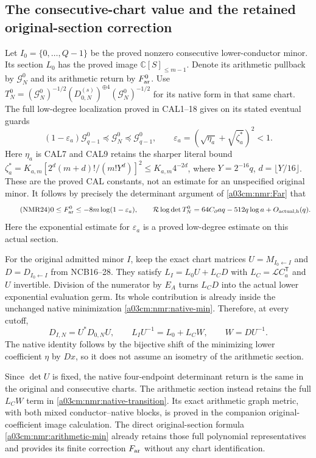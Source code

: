 \documentclass[11pt,a4paper]{article}
\begin{document}
\subsection{The consecutive-chart value and the retained original-section correction}
Let $I_0=\{0,\ldots,Q-1\}$ be the proved nonzero consecutive
lower-conductor minor. Its section $L_0$ has the proved image
$\mathbb C[S]_{\leq m-1}$. Denote its arithmetic pullback by
$\mathcal G_N^0$ and its arithmetic return by $F_{\rm ar}^0$.
Use $T_N^0=(\mathcal G_N^0)^{-1/2}
 (D_{0,N}^{(s)})^{\oplus4}(\mathcal G_N^0)^{-1/2}$ for its
native form in that same chart.
The full low-degree localization proved in CAL1--18 gives on its
stated eventual guards
\[
(1-\varepsilon_a)\mathcal G_{q-1}^0
\preceq\mathcal G_N^0\preceq\mathcal G_{q-1}^0,\qquad
\varepsilon_a=(\sqrt{\eta_a}+\sqrt{\zeta_a^*})^2<1 .
\]
Here $\eta_a$ is CAL7 and CAL9 retains the sharper literal bound
$\zeta_a^*=K_{a,m}[2^d(m+d)!/(m!Y^d)]^2\leq K_{a,m}4^{-2d}$,
where $Y=2^{-16}q$, $d=\lfloor Y/16\rfloor$.
These are the proved CAL constants, not an estimate for an
unspecified original minor.
It follows by precisely the determinant argument of
\eqref{a03cm:nmr:Far} that
\begin{equation}\tag{NMR24}\label{a03cm:nmr:consecutive-return}
0\leq F_{\rm ar}^0\leq-8m\log(1-\varepsilon_a),\qquad
\mathcal R\log\det T_N^0
=64C_\partial aq-512q\log a+O_{\rm actual,h}(q).
\end{equation}
Here the exponential estimate for $\varepsilon_a$ is a proved
low-degree estimate on this actual section.

For the original admitted minor $I$, keep the exact chart matrices
$U=M_{I_0\leftarrow I}$ and $D=D_{I_0\leftarrow I}$ from NCB16--28.
They satisfy
$L_I=L_0U+L_CD$ with $L_C=\mathcal LC_a^{\mathsf T}$ and $U$
invertible. Division of the numerator by $E_A$ turns $L_CD$ into
the actual lower exponential evaluation germ. Its whole contribution
is already inside the unchanged native minimization
\eqref{a03cm:nmr:native-min}. Therefore, at every cutoff,
\begin{equation}\tag{NMR25}\label{a03cm:nmr:native-transition}
D_{I,N}=U^*D_{0,N}U,\qquad
L_IU^{-1}=L_0+L_CW,\qquad W=DU^{-1}.
\end{equation}
The native identity follows by the bijective shift of the minimizing
lower coefficient $\eta$ by $Dx$, so it does not assume an isometry
of the arithmetic section.

Since $\det U$ is fixed, the native four-endpoint determinant return
is the same in the original and consecutive charts. The arithmetic
section instead retains the full $L_CW$ term in
\eqref{a03cm:nmr:native-transition}. Its exact arithmetic graph metric,
with both mixed conductor--native blocks, is proved in the companion
original-coefficient image calculation. The direct original-section
formula \eqref{a03cm:nmr:arithmetic-min} already retains those full
polynomial representatives and provides its finite correction
$F_{\rm ar}$ without any chart identification.
\end{document}
